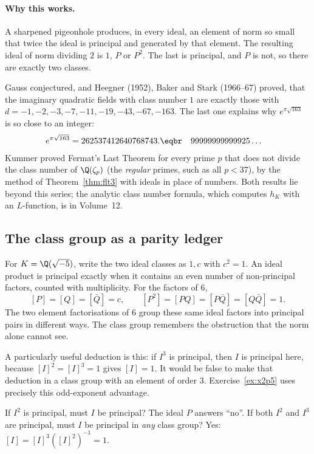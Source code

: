 \paragraph{Why this works.}
A sharpened pigeonhole produces, in every ideal, an element of norm so small that twice the ideal is principal and generated by that element. The resulting ideal of norm dividing $2$ is $1$, $P$ or $P^2$. The last is principal, and $P$ is not, so there are exactly two classes.

\begin{remark}
Gauss conjectured, and Heegner (1952), Baker and Stark (1966--67) proved, that the imaginary quadratic fields with class number $1$ are exactly those with $d=-1,-2,-3,-7,-11,-19,-43,-67,-163$. The last one explains why $e^{\pi\sqrt{163}}$ is so close to an integer:
\[\begin{aligned}e^{\pi\sqrt{163}}&=262537412640768743.\eqbr\quad99999999999925\ldots\end{aligned}\]
 Kummer proved Fermat's Last Theorem for every prime $p$ that does not divide the class number of $\Q(\zeta_p)$ (the \emph{regular} primes, such as all $p<37$), by the method of Theorem~\ref{thm:flt3} with ideals in place of numbers. Both results lie beyond this series; the analytic class number formula, which computes $h_K$ with an $L$-function, is in Volume~12.
\end{remark}

\subsection*{The class group as a parity ledger}
For $K=\Q(\sqrt{-5})$, write the two ideal classes as $1,c$ with $c^2=1$.
An ideal product is principal exactly when it contains an even number of
non-principal factors, counted with multiplicity. For the factors of $6$,
\[
[P]=[Q]=[\bar Q]=c,\qquad
[P^2]=[PQ]=[P\bar Q]=[Q\bar Q]=1.
\]
The two element factorisations of $6$ group these same ideal factors into
principal pairs in different ways. The class group remembers the obstruction
that the norm alone cannot see.

A particularly useful deduction is this: if $I^3$ is principal, then $I$ is
principal here, because $[I]^2=[I]^3=1$ gives $[I]=1$.
It would be false to make that deduction in a class group with an element of
order $3$. Exercise~\ref{ex:x2p5} uses precisely this odd-exponent advantage.

\begin{think}
If $I^2$ is principal, must $I$ be principal? The ideal $P$ answers ``no''.
If both $I^2$ and $I^3$ are principal, must $I$ be principal in \emph{any}
class group? Yes: $[I]=[I]^3([I]^2)^{-1}=1$.
\end{think}

